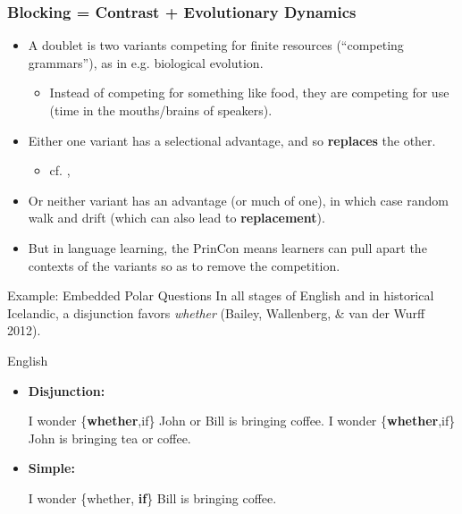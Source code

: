 \documentclass[hyperref={pdfpagelabels=false}]{beamer}
\begin{document}
\begin{frame}
\frametitle{Blocking = Contrast + Evolutionary Dynamics}
\begin{itemize}
	\item A doublet is two variants competing for finite resources (``competing grammars''), as in e.g. biological evolution.
		\begin{itemize} 
			\item Instead of competing for something like food, they are competing for use (time in the mouths/brains of speakers). 
			

			\end{itemize}
	\item Either one variant has a selectional advantage, and so \textbf{replaces} the other. 	
	\begin{itemize} \item \small{cf. \citet[][and subs.]{yang2000}, \citet{heycockwallenberg2013}}

			\end{itemize}
	\item Or neither variant has an advantage (or much of one), in which case random walk and drift (which can also lead to \textbf{replacement}).
	

	\item But in language learning, the PrinCon means learners can pull apart the contexts of the variants so as to remove the competition.
\end{itemize}
\end{frame}


\begin{frame}{Example: Embedded Polar Questions}
		In all stages of English and in historical Icelandic, a disjunction favors {\it whether} (Bailey, Wallenberg, \& van der Wurff 2012). \nocite{baileywallenbergwurff2012}
	\begin{block}{English}
		\begin{itemize}
		\item[ ]\textbf{Disjunction:}
		\begin{exe}
			\ex I wonder \{{\bf whether},if\} John or Bill is bringing coffee.
			\ex I wonder \{{\bf whether},if\} John is bringing tea or coffee.
		\end{exe}
		\item[ ]\textbf{Simple:}
		\begin{exe}
			\ex I wonder \{whether, {\bf if}\} Bill is bringing coffee.
		\end{exe}
		\end{itemize}
	
	\end{block}
\end{frame}
\end{document}
